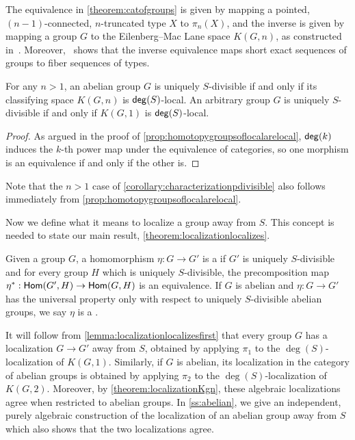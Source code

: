 The equivalence in \cref{theorem:catofgroups} is given by mapping a pointed,
$(n-1)$-connected, $n$-truncated type $X$ to $\pi_n( X )$,
and the inverse is given by mapping a group $G$ to the Eilenberg--Mac Lane
space $K(G,n)$, as constructed in~\cite{FinsterLicata}.
Moreover,~\cite{BuchholtzDoornRijke} shows that the inverse equivalence maps
short exact sequences of groups to fiber sequences of types.

\begin{cor}\label{corollary:characterizationpdivisible}
    For any $n > 1$, an abelian group $G$ is uniquely $S$-divisible if and only if its classifying space $K(G,n)$
    is $\mathsf{deg}(S)$-local. An arbitrary group $G$ is uniquely $S$-divisible if and only if $K(G,1)$ is $\mathsf{deg}(S)$-local.
\end{cor}

\begin{proof}
    As argued in the proof of \cref{prop:homotopygroupsoflocalarelocal}, $\mathsf{deg}(k)$ induces the $k$-th power map under the equivalence of categories, so one morphism is an equivalence if and only if the other is.
\end{proof}

Note that the $n > 1$ case of \cref{corollary:characterizationpdivisible} also follows
immediately from \cref{prop:homotopygroupsoflocalarelocal}.

Now we define what it means to localize a group away from $S$.
This concept is needed to state our main result, \cref{theorem:localizationlocalizes}.

\begin{defn}\label{def:localizationofgroups}
    Given a group $G$, a homomorphism $\eta : G \to G'$ is a  if $G'$ is uniquely $S$-divisible and for every group $H$
    which is uniquely $S$-divisible, the precomposition map ${\eta}^\ast : \mathsf{Hom}(G', H) \to \mathsf{Hom}(G, H)$ is an equivalence.
    If $G$ is abelian and $\eta : G \to G'$ has the universal property only with respect to uniquely
    $S$-divisible abelian groups, we say $\eta$ is a .
\end{defn}

\begin{rmk}\label{rmk:localizationofgroups}
It will follow from \cref{lemma:localizationlocalizesfirst} that every group $G$ has a localization $G \to G'$
away from $S$, obtained by applying $\pi_1$ to the $\deg(S)$-localization of $K(G, 1)$.
Similarly, if $G$ is abelian, its localization in the category of abelian groups is obtained
by applying $\pi_2$ to the $\deg(S)$-localization of $K(G,2)$.
Moreover, by \cref{theorem:localizationKgn}, these algebraic localizations agree
when restricted to abelian groups.
In \cref{ss:abelian}, we give an independent, purely algebraic construction of
the localization of an abelian group away from $S$ which also shows that the
two localizations agree.
\end{rmk}

